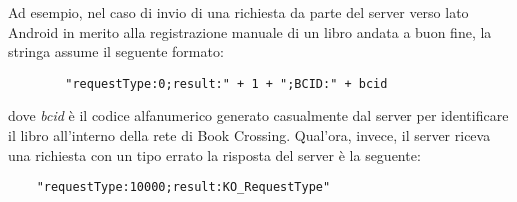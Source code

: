 \noindent Ad esempio, nel caso di invio di una richiesta da parte del server verso lato Android in merito alla registrazione manuale di un libro andata a buon fine, la stringa assume il seguente formato:
\begin{center}
	\begin{lstlisting}
		"requestType:0;result:" + 1 + ";BCID:" + bcid
	\end{lstlisting}
\end{center}
dove \textit{bcid} è il codice alfanumerico generato casualmente dal server per identificare il libro all'interno della rete di Book Crossing.
Qual'ora, invece, il server riceva una richiesta con un tipo errato la risposta del server è la seguente:
\begin{center}
	\begin{lstlisting}
	"requestType:10000;result:KO_RequestType"
	\end{lstlisting}
\end{center}




